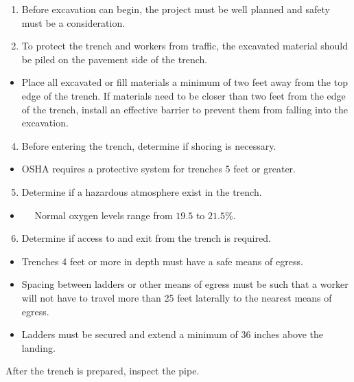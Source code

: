 \documentclass[10pt]{article}
\begin{document}
\begin{enumerate}
  \item Before excavation can begin, the project must be well planned and safety must be a consideration.

  \item To protect the trench and workers from traffic, the excavated material should be piled on the pavement side of the trench.

\end{enumerate}
\begin{itemize}
  \item Place all excavated or fill materials a minimum of two feet away from the top edge of the trench. If materials need to be closer than two feet from the edge of the trench, install an effective barrier to prevent them from falling into the excavation.
\end{itemize}
\begin{enumerate}
  \setcounter{enumi}{3}
  \item Before entering the trench, determine if shoring is necessary.
\end{enumerate}
\begin{itemize}
  \item OSHA requires a protective system for trenches 5 feet or greater.
\end{itemize}
\begin{enumerate}
  \setcounter{enumi}{4}
  \item Determine if a hazardous atmosphere exist in the trench.
\end{enumerate}
\begin{itemize}
  \item $\quad$ Normal oxygen levels range from $19.5$ to $21.5 \%$.
\end{itemize}
\begin{enumerate}
  \setcounter{enumi}{5}
  \item Determine if access to and exit from the trench is required.
\end{enumerate}
\begin{itemize}
  \item Trenches 4 feet or more in depth must have a safe means of egress.

  \item Spacing between ladders or other means of egress must be such that a worker will not have to travel more than 25 feet laterally to the nearest means of egress.

  \item Ladders must be secured and extend a minimum of 36 inches above the landing.

\end{itemize}
After the trench is prepared, inspect the pipe.
\end{document}
